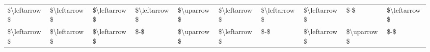 \begin{tabular}{llllllllll}
\$\textbackslash leftarrow\$ & \$\textbackslash leftarrow\$ & \$\textbackslash leftarrow\$ & \$\textbackslash leftarrow\$ & \$\textbackslash uparrow\$ & \$\textbackslash leftarrow\$ & \$\textbackslash leftarrow\$ & \$\textbackslash leftarrow\$ &          \$-\$ & \$\textbackslash leftarrow\$ \\
\$\textbackslash leftarrow\$ & \$\textbackslash leftarrow\$ & \$\textbackslash leftarrow\$ &          \$-\$ & \$\textbackslash uparrow\$ & \$\textbackslash leftarrow\$ &          \$-\$ & \$\textbackslash leftarrow\$ &   \$\textbackslash uparrow\$ &          \$-\$ \\
\bottomrule
\end{tabular}
